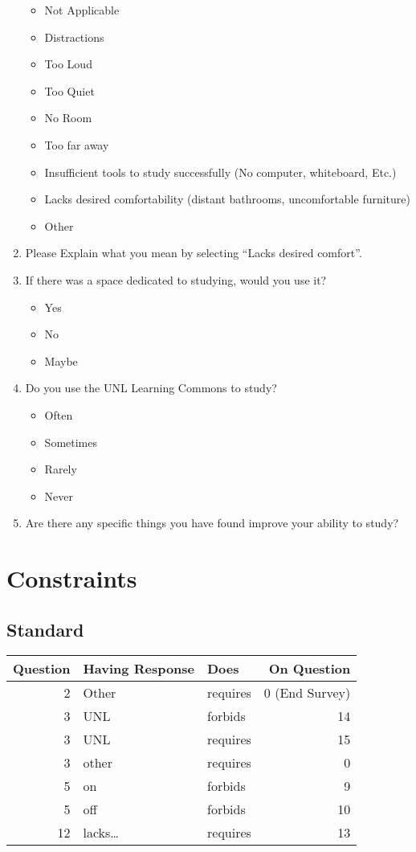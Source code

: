 \documentclass[10pt,twocolumn]{article}
\begin{document}
\begin{enumerate}
\begin{itemize}
\item Not Applicable
\item Distractions
\item Too Loud
\item Too Quiet
\item No Room
\item Too far away
\item Insufficient tools to study successfully (No computer, whiteboard, Etc.)
\item Lacks desired comfortability (distant bathrooms, uncomfortable furniture)
\item Other
\end{itemize}
\item Please Explain what you mean by selecting ``Lacks desired comfort''.
\item If there was a space dedicated to studying, would you use it?
\begin{itemize}
\item Yes
\item No
\item Maybe
\end{itemize}
\item Do you use the UNL Learning Commons to study?
\begin{itemize}
\item Often
\item Sometimes
\item Rarely
\item Never
\end{itemize}
\item Are there any specific things you have found improve your ability to study?
\end{enumerate}


\section*{Constraints}
\label{sec:org57c17ba}

\subsection*{Standard}
\label{sec:orgb6b3e5d}

\begin{center}
\begin{tabular}{rllr}
Question & Having Response & Does & On Question\\
\hline
2 & Other & requires & 0 (End Survey)\\
3 & UNL & forbids & 14\\
3 & UNL & requires & 15\\
3 & other & requires & 0\\
5 & on & forbids & 9\\
5 & off & forbids & 10\\
12 & lacks\ldots{} & requires & 13\\
\end{tabular}
\end{center}
\end{document}
